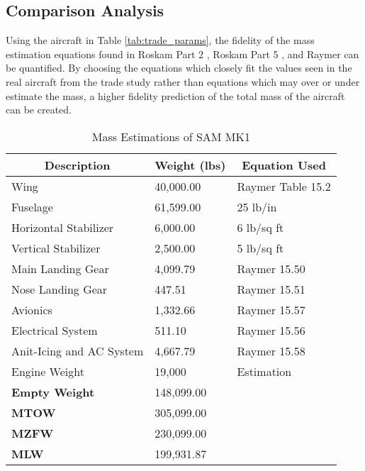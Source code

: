 \subsection{Comparison Analysis}
\label{subsection: comparison}
Using the aircraft in Table \ref{tab:trade_params}, the fidelity of the mass estimation equations found in Roskam Part 2 \cite{roskam_2}, Roskam Part 5 \cite{roskam_5}, and Raymer \cite{raymer} can be quantified. By choosing the equations which closely fit the values seen in the real aircraft from the trade study rather than equations which may over or under estimate the mass, a higher fidelity prediction of the total mass of the aircraft can be created.

\begin{table}[!h]
\centering
\caption{Mass Estimations of SAM MK1}
\begin{tabular}{|p{4cm}||p{2cm}|p{3cm}| }
\toprule
\multicolumn{1}{|c||}{\textbf{Description}} & \multicolumn{1}{c|}{\textbf{Weight (lbs)}} &  
\multicolumn{1}{c|}{\textbf{Equation Used}} \\ \hline \hline 
Wing & 40,000.00 & Raymer Table 15.2 \\ \hline
Fuselage & 61,599.00 & 25 lb/in \\ \hline
Horizontal Stabilizer & 6,000.00 & 6 lb/sq ft \\ \hline
Vertical Stabilizer & 2,500.00 & 5 lb/sq ft \\ \hline
Main Landing Gear & 4,099.79 & Raymer 15.50 \\ \hline
Nose Landing Gear & 447.51 & Raymer 15.51 \\ \hline
Avionics & 1,332.66 & Raymer 15.57 \\ \hline
Electrical System & 511.10 & Raymer 15.56 \\ \hline
Anit-Icing and AC System & 4,667.79 & Raymer 15.58 \\ \hline
Engine Weight & 19,000 & Estimation \\ \hline
\textbf{Empty Weight} & 148,099.00 &  \\ \hline
\textbf{MTOW} & 305,099.00 &  \\ \hline
\textbf{MZFW} & 230,099.00 &  \\ \hline
\textbf{MLW} & 199,931.87 &  \\
\bottomrule
\end{tabular}
\label{tab:mass_props}
\end{table}
\FloatBarrier



